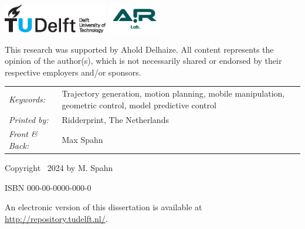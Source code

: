 \begin{titlepage}
\vfill
\begin{center}
    \includegraphics[height=0.5in]{logos/tudelft}
    \hspace{2em}
    \includegraphics[height=0.5in]{logos/airlab.png} \\
\end{center}
\vfill

This research was supported by Ahold Delhaize. All content represents the opinion
of the author(s), which is not necessarily shared or endorsed by their respective
employers and/or sponsors.

\noindent
\begin{tabular}{@{}p{}@{}p{}}
    \textit{Keywords:} & Trajectory generation, motion
    planning, mobile manipulation, geometric control, model
    predictive control\\[\medskipamount]
    \textit{Printed by:} & Ridderprint, The Netherlands \\[\medskipamount]
    \textit{Front \& Back:} & Max Spahn
\end{tabular}

\vspace{4\bigskipamount}

\noindent Copyright \textcopyright\ 2024 by M. Spahn


\medskip
\noindent ISBN 000-00-0000-000-0

\medskip
\noindent An electronic version of this dissertation is available at \\
\url{http://repository.tudelft.nl/}.

\end{titlepage}

